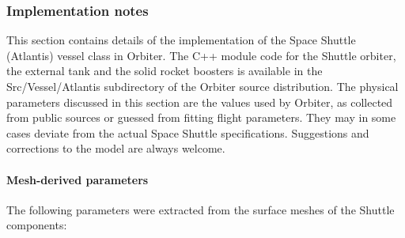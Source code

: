 \documentclass[Orbiter User Manual.tex]{subfiles}
\begin{document}
\subsubsection{Implementation notes}
This section contains details of the implementation of the Space Shuttle (Atlantis) vessel class in Orbiter. The C++ module code for the Shuttle orbiter, the external tank and the solid rocket boosters is available in the Src/Vessel/Atlantis subdirectory of the Orbiter source distribution. The physical parameters discussed in this section are the values used by Orbiter, as collected from public sources or guessed from fitting flight parameters. They may in some cases deviate from the actual Space Shuttle specifications. Suggestions and corrections to the model are always welcome.

\paragraph{Mesh-derived parameters}
The following parameters were extracted from the surface meshes of the Shuttle components:
\end{document}
